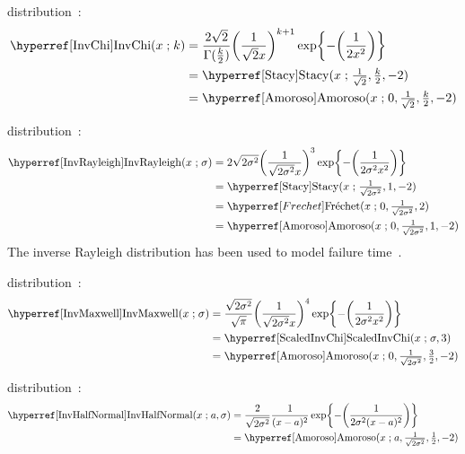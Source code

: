  distribution~\cite{Lee2012}: 
\begin{align}
\label{InvChi}
\opr{InvChi}(x \given k) 
&= \frac{2\sqrt{2} }{ \Gamma(\tfrac{k}{2})} { \Left(\frac{1}{\sqrt{2} x}\Right)}^{k+1} \exp\Left\{-\Left(\frac{1}{2 x^2}  \Right)\Right\}
\checked
\\
&=  \opr{Stacy}(x\given  \tfrac{1}{\sqrt{2}}, \tfrac{k}{2}, -2)  \notag \checked \\
&=  \opr{Amoroso}(x\given  0, \tfrac{1}{\sqrt{2}} , \tfrac{k}{2}, -2) \notag  \checked
\end{align}



 distribution~\cite{Evans2000}:
\begin{align}
\label{InvRayleigh}
\opr{InvRayleigh}(x \given \sigma) 
&= 2 \sqrt{2 \sigma ^2}    \Left(\frac{1}{\sqrt{2 \sigma^2} x}\Right)^{3} \exp\Left\{-\Left(\frac{1}{2 \sigma^2 x^2}  \Right)\Right\}
\checked
\\
&=  \opr{Stacy}(x\given \tfrac{1}{\sqrt{2 \sigma^2}}, 1, -2)  \notag \checked \\
& = \Frechet(x\given 0, \tfrac{1}{\sqrt{2 \sigma^2}}, 2)\notag \\
&=  \opr{Amoroso}(x\given  0, \tfrac{1}{\sqrt{2 \sigma^2}}, 1, -2)  \checked \notag 
\end{align}
The inverse Rayleigh distribution has been used to model failure time~\cite{Voda1972}.



 distribution~\cite{Shakil2010a}:
%
\begin{align}
\label{InvMaxwell}
\opr{InvMaxwell}(x \given \sigma) 
&= \frac{\sqrt{2 \sigma ^2} }{ \sqrt{\pi}} { \Left(\frac{1}{\sqrt{2 \sigma^2} x}\Right)}^{4} \exp\Left\{-\Left(\frac{1}{2 \sigma^2 x^2}  \Right)\Right\}
\checked 
\\
&= \opr{ScaledInvChi}(x \given \sigma, 3) \checked \notag \\
&= \opr{Amoroso}(x\given  0, \tfrac{1}{\sqrt{2 \sigma^2}}, \tfrac{3}{2}, -2) \notag  \checked
\end{align}



 distribution~\cite{Shakil2010a}:
%
\begin{align}
\label{InvHalfNormal}
\opr{InvHalfNormal}(x \given a, \sigma)
&= \frac{2}{\sqrt{2 \sigma ^2}}   \frac{1}{(x-a)^2} \exp\Left\{-\Left(\frac{1}{2 \sigma^2 (x-a)^2}  \Right)\Right\} 
\checked
\\
&=  \opr{Amoroso}(x\given  a, \tfrac{1}{\sqrt{2 \sigma^2}}, \tfrac{1}{2}, -2) \notag  \checked
\end{align}



